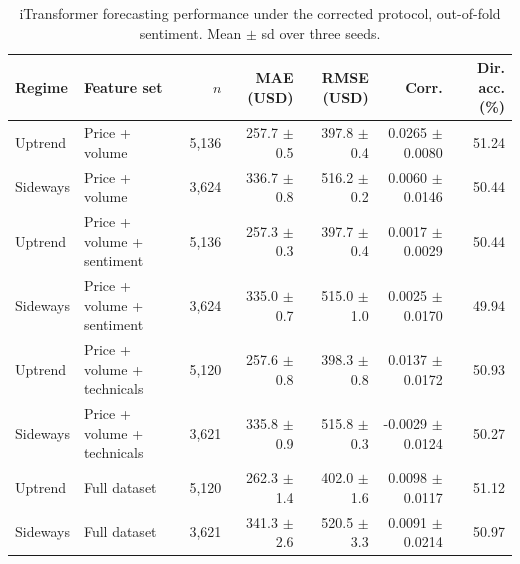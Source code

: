 \begin{table}[htbp]
\centering
\caption{iTransformer forecasting performance under the corrected protocol, out-of-fold sentiment. Mean $\pm$ sd over three seeds.}
\label{tab:itransformer_forecasting_oof}
\begin{tabular}{llrrrrr}
\hline
Regime & Feature set & $n$ & MAE (USD) & RMSE (USD) & Corr. & Dir. acc. (\%) \\
\hline
        Uptrend & Price + volume & 5,136 & 257.7 $\pm$ 0.5 & 397.8 $\pm$ 0.4 & 0.0265 $\pm$ 0.0080 & 51.24 \\
        Sideways & Price + volume & 3,624 & 336.7 $\pm$ 0.8 & 516.2 $\pm$ 0.2 & 0.0060 $\pm$ 0.0146 & 50.44 \\
        Uptrend & Price + volume + sentiment & 5,136 & 257.3 $\pm$ 0.3 & 397.7 $\pm$ 0.4 & 0.0017 $\pm$ 0.0029 & 50.44 \\
        Sideways & Price + volume + sentiment & 3,624 & 335.0 $\pm$ 0.7 & 515.0 $\pm$ 1.0 & 0.0025 $\pm$ 0.0170 & 49.94 \\
        Uptrend & Price + volume + technicals & 5,120 & 257.6 $\pm$ 0.8 & 398.3 $\pm$ 0.8 & 0.0137 $\pm$ 0.0172 & 50.93 \\
        Sideways & Price + volume + technicals & 3,621 & 335.8 $\pm$ 0.9 & 515.8 $\pm$ 0.3 & -0.0029 $\pm$ 0.0124 & 50.27 \\
        Uptrend & Full dataset & 5,120 & 262.3 $\pm$ 1.4 & 402.0 $\pm$ 1.6 & 0.0098 $\pm$ 0.0117 & 51.12 \\
        Sideways & Full dataset & 3,621 & 341.3 $\pm$ 2.6 & 520.5 $\pm$ 3.3 & 0.0091 $\pm$ 0.0214 & 50.97 \\
\hline
\end{tabular}
\end{table}
